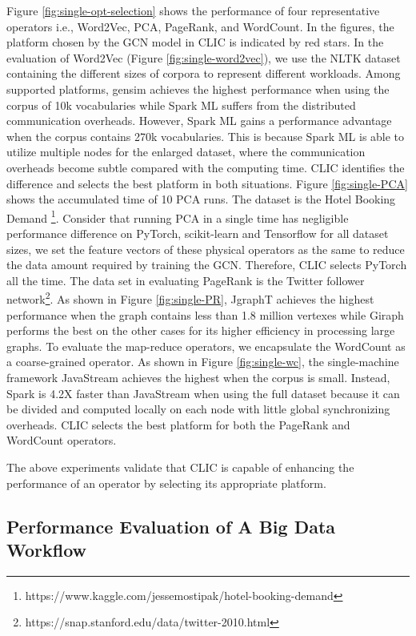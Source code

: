 Figure \ref{fig:single-opt-selection} shows the performance of four representative operators i.e., Word2Vec, PCA, PageRank, and WordCount. In the figures, the platform chosen by the GCN model in CLIC is indicated by red stars. In the evaluation of Word2Vec (Figure \ref{fig:single-word2vec}), we use the NLTK dataset containing the different sizes of corpora to represent different workloads. Among supported platforms, gensim achieves the highest performance when using the corpus of 10k vocabularies while Spark ML suffers from the distributed communication overheads. However, Spark ML gains a performance advantage when the corpus contains 270k vocabularies. This is because Spark ML is able to utilize multiple nodes for the enlarged dataset, where the communication overheads become subtle compared with the computing time. CLIC identifies the difference and selects the best platform in both situations. Figure \ref{fig:single-PCA} shows the accumulated time of 10 PCA runs. The dataset is the Hotel Booking Demand \footnote{https://www.kaggle.com/jessemostipak/hotel-booking-demand}. Consider that running PCA in a single time has negligible performance difference on PyTorch, scikit-learn and Tensorflow for all dataset sizes, we set the feature vectors of these physical operators as the same to reduce the data amount required by training the GCN. Therefore, CLIC selects PyTorch all the time. The data set in evaluating PageRank is the Twitter follower network\footnote{https://snap.stanford.edu/data/twitter-2010.html}. As shown in Figure \ref{fig:single-PR}, JgraphT achieves the highest performance when the graph contains less than 1.8 million vertexes while Giraph performs the best on the other cases for its higher efficiency in processing large graphs. To evaluate the map-reduce operators, we encapsulate the WordCount as a coarse-grained operator. As shown in Figure \ref{fig:single-wc}, the single-machine framework JavaStream achieves the highest when the corpus is small. Instead, Spark is 4.2X faster than JavaStream when using the full dataset because it can be divided and computed locally on each node with little global synchronizing overheads. CLIC selects the best platform for both the PageRank and WordCount operators.

The above experiments validate that CLIC is capable of enhancing the performance of an operator by selecting its appropriate platform.

\subsection{Performance Evaluation of A Big Data Workflow}

